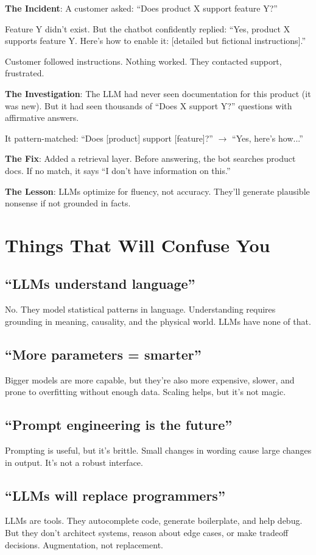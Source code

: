 \textbf{The Incident}: A customer asked: ``Does product X support feature Y?''

Feature Y didn't exist. But the chatbot confidently replied: ``Yes, product X supports feature Y. Here's how to enable it: [detailed but fictional instructions].''

Customer followed instructions. Nothing worked. They contacted support, frustrated.

\textbf{The Investigation}: The LLM had never seen documentation for this product (it was new). But it had seen thousands of ``Does X support Y?'' questions with affirmative answers.

It pattern-matched: ``Does [product] support [feature]?'' $\to$ ``Yes, here's how...''

\textbf{The Fix}: Added a retrieval layer. Before answering, the bot searches product docs. If no match, it says ``I don't have information on this.''

\textbf{The Lesson}: LLMs optimize for fluency, not accuracy. They'll generate plausible nonsense if not grounded in facts.

\section{Things That Will Confuse You}

\subsection{``LLMs understand language''}
No. They model statistical patterns in language. Understanding requires grounding in meaning, causality, and the physical world. LLMs have none of that.

\subsection{``More parameters = smarter''}
Bigger models are more capable, but they're also more expensive, slower, and prone to overfitting without enough data. Scaling helps, but it's not magic.

\subsection{``Prompt engineering is the future''}
Prompting is useful, but it's brittle. Small changes in wording cause large changes in output. It's not a robust interface.

\subsection{``LLMs will replace programmers''}
LLMs are tools. They autocomplete code, generate boilerplate, and help debug. But they don't architect systems, reason about edge cases, or make tradeoff decisions. Augmentation, not replacement.

